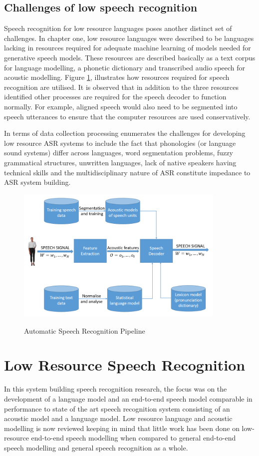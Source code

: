 \subsection{Challenges of low speech recognition}
Speech recognition for low resource languages poses another distinct set of challenges.  In chapter one, low resource languages were described to be languages lacking in resources required for adequate machine learning of models needed for generative speech models.  These resources are described basically as a text corpus for language modelling, a phonetic dictionary and transcribed audio speech for acoustic modelling. Figure \ref{fig_2_2_asr_pipeline}, illustrates how resources required for speech recognition are utilised.  It is observed that in addition to the three resources identified other processes are required for the speech decoder to function normally.  For example, aligned speech would also need to be segmented into speech utterances to ensure that the computer resources are used conservatively.

In terms of data collection processing \cite{besacier2014automatic} enumerates the  challenges for developing low resource ASR systems to include the fact that phonologies (or language sound systems) differ across languages, word segmentation problems, fuzzy grammatical structures, unwritten languages, lack of native speakers having technical skills and the multidisciplinary nature of ASR constitute impedance to ASR system building.

\begin{figure}
\centering
  \includegraphics[width=10cm]{thesis/images/asr_pipeline}\\
  \caption{Automatic Speech Recognition Pipeline} \cite{besacier2014automatic}\label{fig_2_2_asr_pipeline}
\end{figure}

\section{Low Resource Speech Recognition}
In this system building speech recognition research, the focus was on the development of a language model and an end-to-end speech model comparable in performance to state of the art speech recognition system consisting of an acoustic model and a language model.  Low resource language and acoustic modelling is now reviewed keeping in mind that little work has been done on low-resource end-to-end speech modelling when compared to general end-to-end speech modelling and general speech recognition as a whole.  

